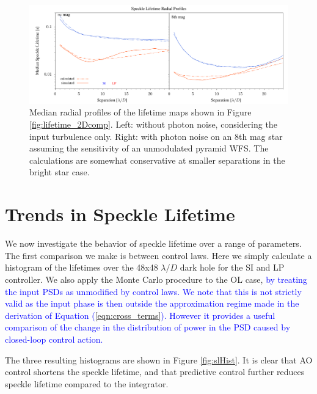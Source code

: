 \documentclass[10pt,preprint]{aastex631}
\newcommand{\jrmadd}[1]{\textcolor{blue}{#1}}
\begin{document}
\begin{figure}
\hspace{-0.3in}
\includegraphics[width=6.5in]{lifetimesRP.pdf}
\caption{Median radial profiles of the lifetime maps shown in Figure \ref{fig:lifetime_2Dcomp}.  Left: without photon noise, considering the input turbulence only.  Right: with photon noise on an 8th mag star assuming the sensitivity of an unmodulated pyramid WFS. The calculations are somewhat conservative at smaller separations in the bright star case.  \label{fig:lifetime_radprof}}
\end{figure}

\clearpage

\section{Trends in Speckle Lifetime}
\label{sec:trends}

We now investigate the behavior of speckle lifetime over a range of parameters.  The first comparison we make is between control laws.  Here we simply calculate a histogram of the lifetimes over the 48x48 $\lambda/D$ dark hole for the SI and LP controller.  We also apply the Monte Carlo procedure to the OL case, \jrmadd{by treating the input PSDs as unmodified by control laws.  We note that this is not strictly valid as the input phase is then outside the approximation regime made in the derivation of Equation (\ref{eqn:cross_terms}).  However it provides a useful comparison of the change in the distribution of power in the PSD caused by closed-loop control action. }

The three resulting histograms are shown in Figure \ref{fig:slHist}.  It is clear that AO control shortens the speckle lifetime, and that predictive control further reduces speckle lifetime compared to the integrator.
\end{document}
